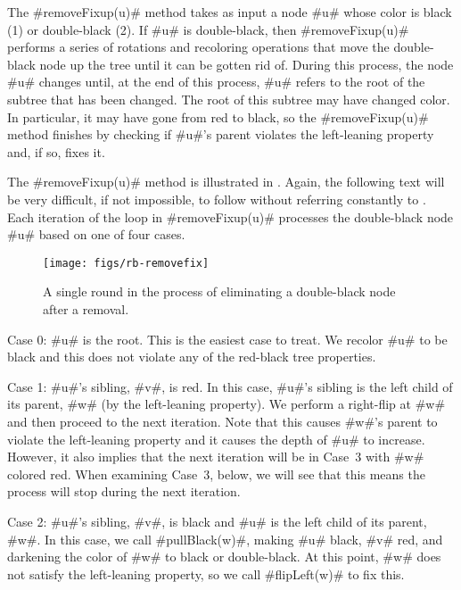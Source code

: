 The #removeFixup(u)# method takes as input a node #u# whose color is black
(1) or double-black (2).  If #u# is double-black, then #removeFixup(u)#
performs a series of rotations and recoloring operations that move the
double-black node up the tree until it can be gotten rid of.  During this
process, the node #u# changes until, at the end of this process, #u#
refers to the root of the subtree that has been changed.  The root of
this subtree may have changed color.  In particular, it may have gone
from red to black, so the #removeFixup(u)# method finishes by checking
if #u#'s parent violates the left-leaning property and, if so, fixes it.

The #removeFixup(u)# method is illustrated in .
Again, the following text will be very difficult, if not impossible,
to follow without referring constantly to .
Each iteration of the loop in #removeFixup(u)# processes the double-black node #u# based on one of four cases.

\begin{figure}
  \begin{center}
    \texttt{[image: figs/rb-removefix]}
  \end{center}
  \caption{A single round in the process of eliminating a double-black node
   after a removal.}
\end{figure}

\noindent
Case 0: #u# is the root.  This is the easiest case to treat.  We recolor #u# to be black and this does not violate any of the red-black tree properties.

\noindent 
Case 1: #u#'s sibling, #v#, is red.  In this case, #u#'s sibling is the
left child of its parent, #w# (by the left-leaning property).  We perform
a right-flip at #w# and then proceed to the next iteration.  Note that
this causes #w#'s parent to violate the left-leaning property and it
causes the depth of #u# to increase.  However, it also implies that the
next iteration will be in Case~3 with #w# colored red.  When examining
Case~3, below, we will see that this means the process will stop during
the next iteration.

\noindent
Case 2: #u#'s sibling, #v#, is black and #u# is the left child of its
parent, #w#.  In this case, we call #pullBlack(w)#, making #u# black,
#v# red, and darkening the color of #w# to black or double-black.
At this point, #w# does not satisfy the left-leaning property, so we
call #flipLeft(w)# to fix this.

